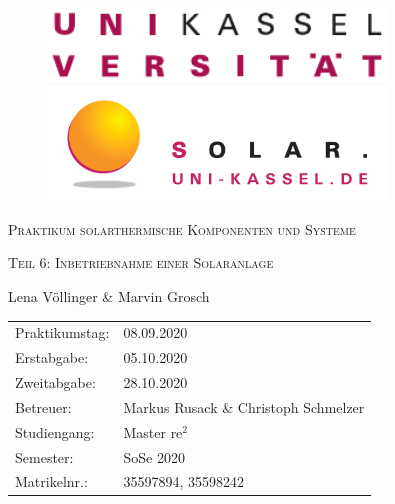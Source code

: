 \documentclass[10pt,a4paper,toc=listof,toc=bibliography]{scrartcl}
\begin{document}
\begin{titlepage}
	
	\begin{figure}[H]
		\begin{minipage}{0.5\textwidth}
			\centering
			\includegraphics[width=0.8\textwidth]{../DATA/Logo_Uni-Kassel.pdf}
		\end{minipage}\hfill
		\begin{minipage}{0.5\textwidth}
			\centering
			\includegraphics[width=0.8\textwidth]{../DATA/Logo_solar.png}
		\end{minipage}
	\end{figure}
	
		\vspace{3cm}
	
	\centering
	{\scshape\LARGE Praktikum solarthermische Komponenten und Systeme\par}   %
	\vspace{1cm}
	{\scshape\Large Teil 6: Inbetriebnahme einer Solaranlage \par}
	\vspace{1.5cm}
	\vspace{2cm}
	{\Large Lena Völlinger \& Marvin Grosch\par}
	\vfill
	
	\begin{large}
		\begin{tabular}{l l}
			
			Praktikumstag: & 08.09.2020 \\
			Erstabgabe: & 05.10.2020\\
			Zweitabgabe: & 28.10.2020\\
			Betreuer: & Markus Rusack \& Christoph Schmelzer\\
			Studiengang: & Master $\text{re}^2$\\
			Semester: & SoSe 2020\\
			Matrikelnr.: & 35597894, 35598242\\ 
		\end{tabular}
	\end{large}

\end{titlepage}


\newpage
\tableofcontents
\listoffigures
\newpage






\newpage
\end{document}
